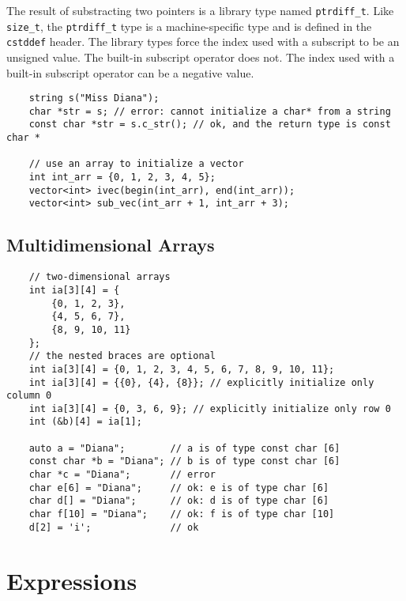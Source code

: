 \documentclass[11pt]{ctexart}
\begin{document}
The result of substracting two pointers is a library type named \verb|ptrdiff_t|. Like \verb|size_t|, the \verb|ptrdiff_t| type is a machine-specific type and is defined in the \verb|cstddef| header. The library types force the index used with a subscript to be an unsigned value. The built-in subscript operator does not. The index used with a built-in subscript operator can be a negative value.
\begin{lstlisting}
    string s("Miss Diana");
    char *str = s; // error: cannot initialize a char* from a string
    const char *str = s.c_str(); // ok, and the return type is const char *

    // use an array to initialize a vector
    int int_arr = {0, 1, 2, 3, 4, 5};
    vector<int> ivec(begin(int_arr), end(int_arr));
    vector<int> sub_vec(int_arr + 1, int_arr + 3);
\end{lstlisting}
\subsection{Multidimensional Arrays}
\begin{lstlisting}
    // two-dimensional arrays
    int ia[3][4] = {
        {0, 1, 2, 3},
        {4, 5, 6, 7},
        {8, 9, 10, 11}
    };
    // the nested braces are optional
    int ia[3][4] = {0, 1, 2, 3, 4, 5, 6, 7, 8, 9, 10, 11};
    int ia[3][4] = {{0}, {4}, {8}}; // explicitly initialize only column 0
    int ia[3][4] = {0, 3, 6, 9}; // explicitly initialize only row 0
    int (&b)[4] = ia[1];

    auto a = "Diana";        // a is of type const char [6]
    const char *b = "Diana"; // b is of type const char [6]
    char *c = "Diana";       // error
    char e[6] = "Diana";     // ok: e is of type char [6]
    char d[] = "Diana";      // ok: d is of type char [6]
    char f[10] = "Diana";    // ok: f is of type char [10]
    d[2] = 'i';              // ok
\end{lstlisting}
\section{Expressions}
\end{document}
